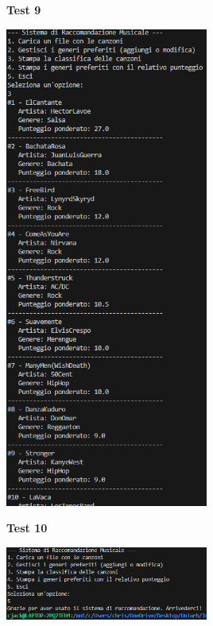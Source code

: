 \documentclass[a4paper,11pt]{article}
\begin{document}
\newpage
\begin{center}
    \textbf{Test 9}
    \par
    \vspace{0.5cm}
    \includegraphics[width=0.5\textwidth]{htest9}
\end{center}
\begin{center}
    \textbf{Test 10}
    \par
    \vspace{0.5cm}
    \includegraphics[width=0.5\textwidth]{htest10}
\end{center}
\vspace{1cm}

\newpage
\end{document}

